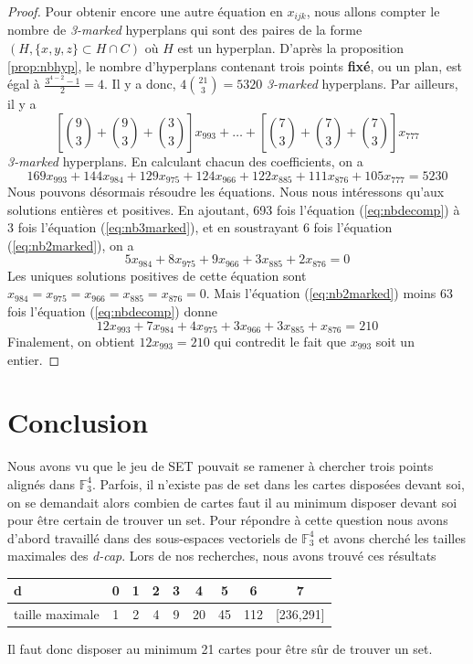 \documentclass[a4paper,12pt,titlepage]{article}
\theoremstyle{plain}
\theoremstyle{definition}
\newcommand{\Ftrois}[1]{\mathbb{F}^#1_3}
\begin{document}
\begin{proof}
Pour obtenir encore une autre équation en $x_{ijk}$, nous allons compter le nombre de \emph{3-marked} hyperplans qui sont des paires de la forme $(H,\{x,y,z\} \subset H \cap C)$ où $H$ est un hyperplan. D'après la proposition \ref{prop:nbhyp}, le nombre d'hyperplans contenant trois points \textbf{fixé}, ou un plan, est égal à $\frac{3^{4-2}-1}{2} = 4$. Il y a donc, $4 \binom{21}{3} = 5320$ \emph{3-marked} hyperplans. Par ailleurs, il y a 
\[
\left[\binom{9}{3}+\binom{9}{3}+\binom{3}{3}\right]x_{993} + \dots + \left[\binom{7}{3}+\binom{7}{3}+\binom{7}{3}\right]x_{777}
\]
\emph{3-marked} hyperplans. En calculant chacun des coefficients, on a
\begin{equation} \label{eq:nb3marked}
169x_{993} + 144x_{984} + 129x_{975} + 124x_{966} + 122x_{885} + 111x_{876} + 105x_{777} = 5230
\end{equation}
Nous pouvons désormais résoudre les équations. Nous nous intéressons qu'aux solutions entières et positives. En ajoutant, 693 fois l'équation (\ref{eq:nbdecomp}) à 3 fois l'équation (\ref{eq:nb3marked}), et en soustrayant 6 fois l'équation (\ref{eq:nb2marked}), on a
\[
5x_{984} + 8x_{975} + 9x_{966} + 3x_{885} + 2x_{876} = 0
\]
Les uniques solutions positives de cette équation sont $x_{984} = x_{975} = x_{966} = x_{885} = x_{876} = 0$. Mais l'équation (\ref{eq:nb2marked}) moins 63 fois l'équation (\ref{eq:nbdecomp}) donne
\[
12x_{993} + 7x_{984} + 4x_{975} + 3x_{966} + 3x_{885} + x_{876} = 210
\]
Finalement, on obtient $12x_{993} = 210$ qui contredit le fait que $x_{993}$ soit un entier.
\end{proof}

\section{Conclusion}
Nous avons vu que le jeu de SET pouvait se ramener à chercher trois points alignés dans $\Ftrois{4}$.
Parfois, il n'existe pas de set dans les cartes disposées devant soi, on se demandait alors combien de cartes faut il au minimum disposer devant soi pour être certain de trouver un set.
Pour répondre à cette question nous avons d'abord travaillé dans des sous-espaces vectoriels de $\Ftrois{4}$
et avons cherché les tailles maximales des \emph{d-cap}. Lors de nos recherches, nous avons trouvé ces résultats

\begin{center}
\begin{tabular}{ l | *{8}{c} }
d & 0 & 1 & 2 & 3 & 4 & 5 & 6 & 7\\
\hline
taille maximale & 1 & 2 & 4 & 9 & 20 & 45 & 112 & [236,291] \\
\end{tabular}
\end{center}

Il faut donc disposer au minimum 21 cartes pour être sûr de trouver un set.



\end{document}
